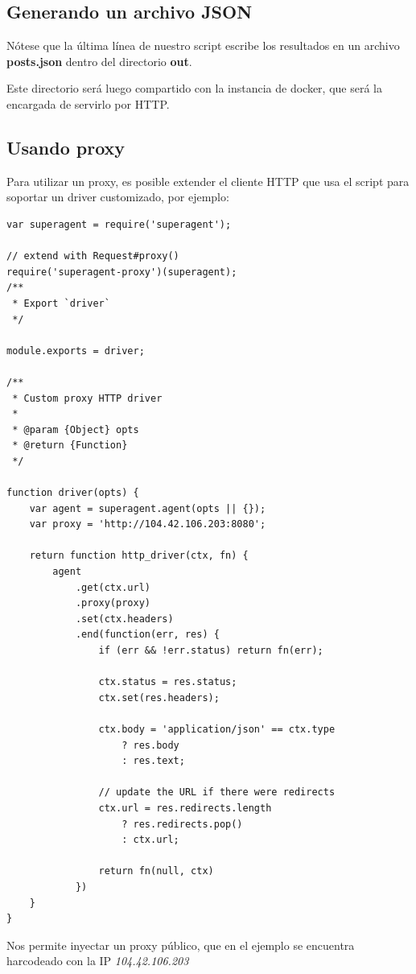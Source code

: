 \documentclass[12pt]{article}
\begin{document}
\subsection{Generando un archivo JSON}

Nótese que la última línea de nuestro script escribe los resultados en un archivo \textbf{posts.json} dentro del directorio \textbf{out}.

Este directorio será luego compartido con la instancia de docker, que será la encargada de servirlo por HTTP.

\subsection{Usando proxy}

Para utilizar un proxy, es posible extender el cliente HTTP que usa el script para soportar un driver customizado, por ejemplo:

\begin{verbatim}
var superagent = require('superagent');

// extend with Request#proxy()
require('superagent-proxy')(superagent);
/**
 * Export `driver`
 */

module.exports = driver;

/**
 * Custom proxy HTTP driver
 *
 * @param {Object} opts
 * @return {Function}
 */

function driver(opts) {
    var agent = superagent.agent(opts || {});
    var proxy = 'http://104.42.106.203:8080';

    return function http_driver(ctx, fn) {
        agent
            .get(ctx.url)
            .proxy(proxy)
            .set(ctx.headers)
            .end(function(err, res) {
                if (err && !err.status) return fn(err);

                ctx.status = res.status;
                ctx.set(res.headers);

                ctx.body = 'application/json' == ctx.type
                    ? res.body
                    : res.text;

                // update the URL if there were redirects
                ctx.url = res.redirects.length
                    ? res.redirects.pop()
                    : ctx.url;

                return fn(null, ctx)
            })
    }
}
\end{verbatim}

Nos permite inyectar un proxy público, que en el ejemplo se encuentra harcodeado con la IP \textit{104.42.106.203}
\end{document}

